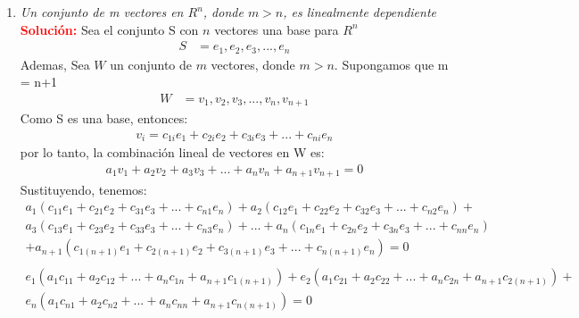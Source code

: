 \documentclass[12pt]{article}
\begin{document}
\begin{enumerate}
\item \textit{Un conjunto de m vectores en $R^{n}$, donde $m > n$, es linealmente dependiente} \\
\noindent \textcolor{red}{\bf Solución:}
Sea el conjunto S con $n$ vectores una base para $R^{n}$
\begin {equation*} \begin {split}
    S &= {e_{1},e_{2},e_{3}, ..., e_{n}} 
\end {split} \end {equation*} 
Ademas, Sea $W$ un conjunto de $m$ vectores, donde $m > n$. Supongamos que m = n+1\\
\begin {equation*} \begin {split}
    W &= {v_{1},v_{2},v_{3}, ..., v_{n}, v_{n+1}} 
\end {split} \end {equation*} 
Como S es una base, entonces:
\begin {equation*} \begin {split}
v_{i} = c_{1i}e_{1} + c_{2i}e_{2} + c_{3i}e_{3} + ... + c_{ni}e_{n}
\end {split} \end {equation*} 
por lo tanto, la combinación lineal de vectores en W es:
\begin {equation*} \begin {split}
a_{1}v_{1} + a_{2}v_{2} + a_{3}v_{3} + ... + a_{n}v_{n} + a_{n+1}v_{n+1} = 0
\end {split} \end {equation*}
Sustituyendo, tenemos: 
\begin {equation*} \begin {split}
a_{1}(c_{11}e_{1} + c_{21}e_{2} + c_{31}e_{3} + ... + c_{n1}e_{n})+ a_{2}(c_{12}e_{1} + c_{22}e_{2} + c_{32}e_{3} + ... + c_{n2}e_{n}) + \\ a_{3}(c_{13}e_{1} + c_{23}e_{2} + c_{33}e_{3} + ... + c_{n3}e_{n})+ ... + a_{n}(c_{1n}e_{1} + c_{2n}e_{2} + c_{3n}e_{3} +  ... + c_{nn}e_{n}) \\ +  a_{n+1}(c_{1{(n+1)}}e_{1} + c_{2{(n+1)}}e_{2} + c_{3{(n+1)}}e_{3} + ... + c_{n{(n+1)}}e_{n}) = 0 \\ \\
e_{1}(a_{1}c_{11} + a_{2}c_{12} + ... + a_{n}c_{1n} + a_{n+1}c_{1(n+1)}) + e_{2}(a_{1}c_{21} + a_{2}c_{22} + ... + a_{n}c_{2n} + a_{n+1}c_{2(n+1)}) + \\ e_{n}(a_{1}c_{n1} + a_{2}c_{n2} + ... + a_{n}c_{nn} + a_{n+1}c_{n(n+1)}) = 0
\end {split} \end {equation*}

\end{enumerate}
\end{document}
